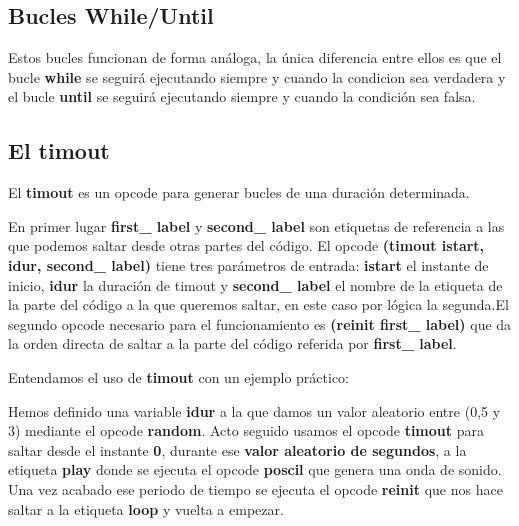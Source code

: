\subsection{Bucles While/Until}


Estos bucles funcionan de forma análoga, la única diferencia entre ellos es que el bucle \textbf{while} se seguirá ejecutando siempre y cuando la condicion sea verdadera y el bucle \textbf{until} se seguirá ejecutando siempre y cuando la condición sea falsa.

\subsection{El timout}

El \textbf{timout} es un opcode para generar bucles de una duración determinada. 


En primer lugar \textbf{first\_ label} y \textbf{second\_ label} son etiquetas de referencia a las que podemos saltar desde otras partes del código. El opcode \textbf{(timout    istart, idur, second\_ label)} tiene tres parámetros de entrada: \textbf{istart} el instante de inicio, \textbf{idur} la duración de timout y \textbf{second\_ label} el nombre de la etiqueta de la parte del código a la que queremos saltar, en este caso por lógica la segunda.El segundo opcode necesario para el funcionamiento es \textbf{(reinit	first\_ label)} que da la orden directa de saltar a la parte del código referida por \textbf{first\_ label}.

Entendamos el uso de \textbf{timout} con un ejemplo práctico:


Hemos definido una variable \textbf{idur} a la que damos un valor aleatorio entre (0,5 y 3) mediante el opcode \textbf{random}. Acto seguido usamos el opcode \textbf{timout} para saltar desde el instante \textbf{0}, durante ese \textbf{valor aleatorio de segundos}, a la etiqueta \textbf{play} donde se ejecuta el opcode \textbf{poscil} que genera una onda de sonido. Una vez acabado ese periodo de tiempo se ejecuta el opcode \textbf{reinit} que nos hace saltar a la etiqueta \textbf{loop} y vuelta a empezar.



